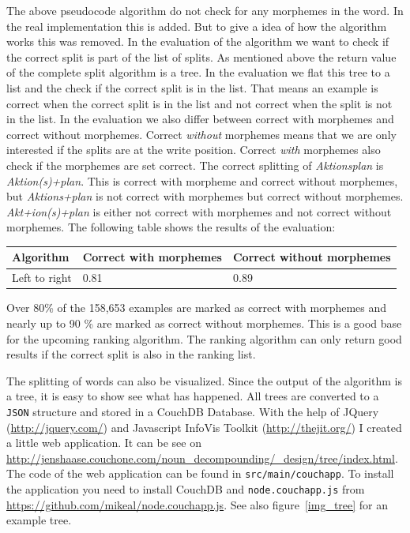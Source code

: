 \documentclass[11pt, accentcolor=tud9b, nochapname]{tudreport}
\begin{document}
The above pseudocode algorithm do not check for any morphemes in the word. In the real implementation this is added. But to give a idea of how the algorithm works this was removed. In the evaluation of the algorithm we want to check if the correct split is part of the list of splits. As mentioned above the return value of the complete split algorithm is a tree. In the evaluation we flat this tree to a list and the check if the correct split is in the list. That means an example is correct when the correct split is in the list and not correct when the split is not in the list. In the evaluation we also differ between correct with morphemes and correct without morphemes. Correct \emph{without} morphemes means that we are only interested if the splits are at the write position. Correct \emph{with} morphemes also check if the morphemes are set correct. The correct splitting of \emph{Aktionsplan} is \emph{Aktion(s)+plan}. This is correct with morpheme and correct without morphemes, but \emph{Aktions+plan} is not correct with morphemes but correct without morphemes. \emph{Akt+ion(s)+plan} is either not correct with morphemes and not correct without morphemes. The following table shows the results of the evaluation:

\begin{table}[h]
\begin{center}
\begin{tabular}{l | l | l}
  \hline
  \textbf{Algorithm}  & \textbf{Correct with morphemes} & \textbf{Correct without morphemes} \\ \hline
  Left to right & 0.81 & 0.89 \\ \hline
\end{tabular}
\end{center}
\end{table}

Over 80\% of the 158,653 examples are marked as correct with morphemes and nearly up to 90 \% are marked as correct without morphemes. This is a good base for the upcoming ranking algorithm. The ranking algorithm can only return good results if the correct split is also in the ranking list.

The splitting of words can also be visualized. Since the output of the algorithm is a tree, it is easy to show see what has happened. All trees are converted to a \texttt{JSON} structure and stored in a CouchDB Database. With the help of JQuery (\url{http://jquery.com/}) and Javascript InfoVis Toolkit (\url{http://thejit.org/}) I created a little web application. It can be see on \url{http://jenshaase.couchone.com/noun_decompounding/_design/tree/index.html}. The code of the web application can be found in \texttt{src/main/couchapp}. To install the application you need to install CouchDB and \texttt{node.couchapp.js} from \url{ https://github.com/mikeal/node.couchapp.js}. See also figure~\ref{img_tree} for an example tree.
\end{document}
